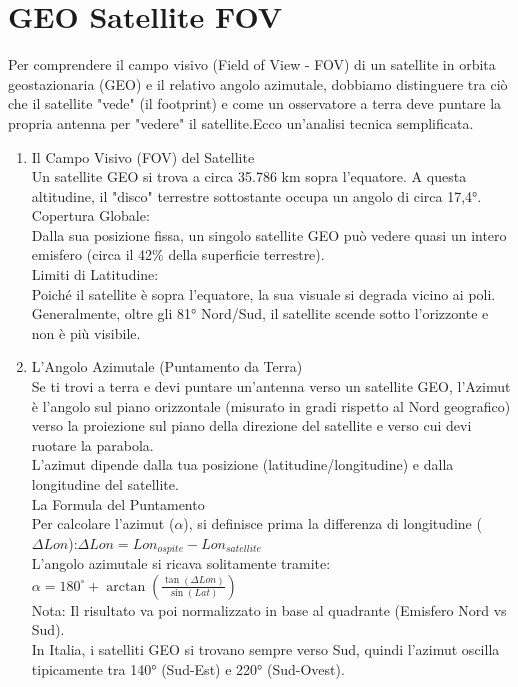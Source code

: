 \documentclass[a4paper,14pt]{article}
\begin{document}
\section{GEO Satellite FOV}
Per comprendere il campo visivo (Field of View - FOV) di un satellite in orbita geostazionaria (GEO) e il relativo angolo azimutale, dobbiamo distinguere tra ciò che il satellite "vede" (il footprint) e come un osservatore a terra deve puntare la propria antenna per "vedere" il satellite.Ecco un'analisi tecnica semplificata.
\begin{enumerate}
\item Il Campo Visivo (FOV) del Satellite\\
Un satellite GEO si trova a circa 35.786 km sopra l'equatore. A questa altitudine, il "disco" terrestre sottostante occupa un angolo di circa 17,4°.
Copertura Globale:\\
Dalla sua posizione fissa, un singolo satellite GEO può vedere quasi un intero emisfero (circa il 42\% della superficie terrestre).\\
Limiti di  Latitudine:\\
Poiché il satellite è sopra l'equatore, la sua visuale si degrada vicino ai poli. Generalmente, oltre gli 81° Nord/Sud, il satellite scende sotto l'orizzonte e non è più visibile.\\
\item L'Angolo Azimutale (Puntamento da Terra)\\
Se ti trovi a terra e devi puntare un'antenna verso un satellite GEO, l'Azimut è l'angolo sul piano orizzontale (misurato in gradi rispetto al Nord geografico) verso la proiezione sul piano della direzione del satellite e verso cui devi ruotare la parabola.\\
L'azimut dipende dalla tua posizione (latitudine/longitudine) e dalla longitudine del satellite.\\
La Formula del Puntamento\\
Per calcolare l'azimut (\(\alpha \)), si definisce prima la differenza di longitudine (\(\Delta Lon\)):\(\Delta Lon=Lon_{ospite}-Lon_{satellite}\)\\
L'angolo azimutale si ricava solitamente tramite:\(\alpha =180^{\circ }+\arctan \left(\frac{\tan (\Delta Lon)}{\sin (Lat)}\right)\)\\
Nota: Il risultato va poi normalizzato in base al quadrante (Emisfero Nord vs Sud).\\
In Italia, i satelliti GEO si trovano sempre verso Sud, quindi l'azimut oscilla tipicamente tra 140° (Sud-Est) e 220° (Sud-Ovest).\\

\end{enumerate}
\end{document}

